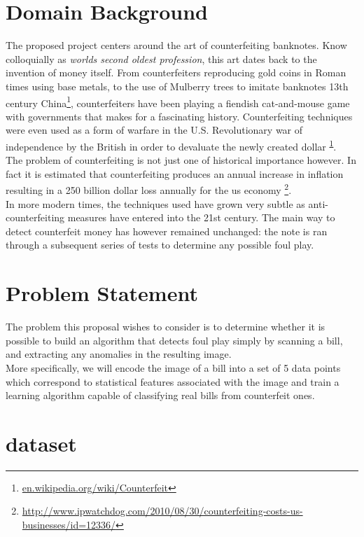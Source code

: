 \documentclass[12pt]{article}
\theoremstyle{plain} \numberwithin{equation}{section}
\theoremstyle{definition}
\begin{document}
\section{Domain Background}

The proposed project centers around the art of counterfeiting banknotes. Know colloquially as \emph{worlds second oldest profession}, this art dates back to the invention of money itself. From counterfeiters reproducing gold coins in Roman times using base metals, to the use of Mulberry trees to imitate banknotes 13th century China\footnote{\label{note1} \url{en.wikipedia.org/wiki/Counterfeit}}, counterfeiters have been playing a fiendish cat-and-mouse game with governments that makes for a fascinating history. Counterfeiting techniques were even used as a form of warfare in the U.S. Revolutionary war of independence by the British in order to devaluate the newly created dollar \textsuperscript{\ref{note1}}.\\
The problem of counterfeiting is not just one of historical importance however. In fact it is estimated that counterfeiting produces an annual increase in inflation resulting in a  250 billion dollar loss annually for the us economy \footnote{\url{http://www.ipwatchdog.com/2010/08/30/counterfeiting-costs-us-businesses/id=12336/}}.\\ 
In more modern times, the techniques used have grown very subtle as anti-counterfeiting measures have entered into the 21st century. The main way to detect counterfeit money has however remained unchanged: the note is ran through a subsequent series of tests to determine any possible foul play. 

\section{Problem Statement}

The problem this proposal wishes to consider is to determine whether it is possible to build an algorithm that detects foul play simply by scanning a bill, and extracting any anomalies in the resulting image.\\ 
More specifically, we will encode the image of a bill into a set of 5 data points which correspond to statistical features associated with the image and train a learning algorithm capable of classifying real bills from counterfeit ones.

\section{dataset}
\end{document}
